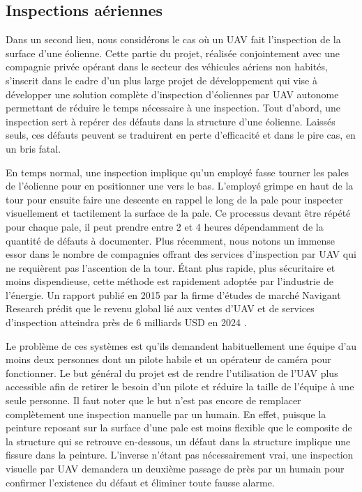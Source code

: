 \subsection{Inspections aériennes}
Dans un second lieu, nous considérons le cas où un UAV fait l'inspection de la surface d'une éolienne. Cette partie du projet, réalisée conjointement avec une compagnie privée opérant dans le secteur des véhicules aériens non habités,
s'inscrit dans le cadre d'un plus large projet de développement qui vise à développer une solution complète d'inspection d'éoliennes par UAV autonome permettant de réduire le temps nécessaire à une inspection. Tout d'abord, une inspection sert à repérer des défauts dans la structure d'une éolienne. Laissés seuls, ces défauts peuvent se traduirent en perte d'efficacité et dans le pire cas, en un bris fatal.

En temps normal, une inspection implique qu'un employé fasse tourner les pales de l'éolienne pour en positionner une vers le bas. L'employé grimpe en haut de la tour pour ensuite faire une descente en rappel le long de la pale pour inspecter visuellement et tactilement la surface de la pale. Ce processus devant être répété pour chaque pale, il peut prendre entre 2 et 4 heures dépendamment de la quantité de défauts à documenter. Plus récemment, nous notons un immense essor dans le nombre de compagnies offrant des services d'inspection par UAV qui ne requièrent pas l'ascention de la tour. Étant plus rapide, plus sécuritaire et moins dispendieuse, cette méthode est rapidement adoptée par l'industrie de l'énergie. Un rapport publié en 2015 par la firme d'études de marché Navigant Research prédit que le revenu global lié aux ventes d'UAV et de services d'inspection atteindra près de 6 milliards USD en 2024 \citep{navigant2015}.

Le problème de ces systèmes est qu'ils demandent habituellement une équipe d'au moins deux personnes dont un pilote habile et un opérateur de caméra pour fonctionner. Le but général du projet est de rendre l'utilisation de l'UAV plus accessible afin de retirer le besoin d'un pilote et réduire la taille de l'équipe à une seule personne. Il faut noter que le but n'est pas encore de remplacer complètement une inspection manuelle par un humain. En effet, puisque la peinture reposant sur la surface d'une pale est moins flexible que le composite de la structure qui se retrouve en-dessous, un défaut dans la structure implique une fissure dans la peinture. L'inverse n'étant pas nécessairement vrai, une inspection visuelle par UAV demandera un deuxième passage de près par un humain pour confirmer l'existence du défaut et éliminer toute fausse alarme.

